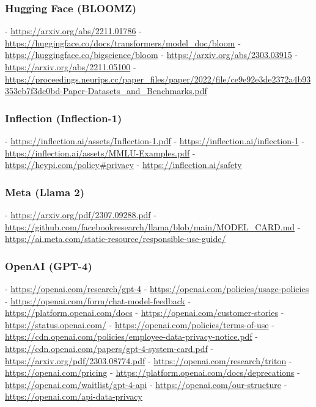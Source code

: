 \documentclass[screen, authorversion, acmsmall]{acmart}
\begin{document}
\subsubsection{Hugging Face (BLOOMZ)}
-  \url{https://arxiv.org/abs/2211.01786}
-  \url{https://huggingface.co/docs/transformers/model_doc/bloom}
-  \url{https://huggingface.co/bigscience/bloom}
-  \url{https://arxiv.org/abs/2303.03915}
-  \url{https://arxiv.org/abs/2211.05100}
-  \url{https://proceedings.neurips.cc/paper_files/paper/2022/file/ce9e92e3de2372a4b93353eb7f3dc0bd-Paper-Datasets_and_Benchmarks.pdf}

\subsubsection{Inflection (Inflection-1)}
-  \url{https://inflection.ai/assets/Inflection-1.pdf}
-  \url{https://inflection.ai/inflection-1}
-  \url{https://inflection.ai/assets/MMLU-Examples.pdf}
-  \url{https://heypi.com/policy#privacy}
-  \url{https://inflection.ai/safety}

\subsubsection{Meta (Llama 2)}
-  \url{https://arxiv.org/pdf/2307.09288.pdf}
-  \url{https://github.com/facebookresearch/llama/blob/main/MODEL_CARD.md}
-  \url{https://ai.meta.com/static-resource/responsible-use-guide/}

\clearpage

\subsubsection{OpenAI (GPT-4)}
-  \url{https://openai.com/research/gpt-4}
-  \url{https://openai.com/policies/usage-policies}
-  \url{https://openai.com/form/chat-model-feedback}
-  \url{https://platform.openai.com/docs}
-  \url{https://openai.com/customer-stories}
-  \url{https://status.openai.com/}
-  \url{https://openai.com/policies/terms-of-use}
-  \url{https://cdn.openai.com/policies/employee-data-privacy-notice.pdf}
-  \url{https://cdn.openai.com/papers/gpt-4-system-card.pdf}
-  \url{https://arxiv.org/pdf/2303.08774.pdf}
-  \url{https://openai.com/research/triton}
-  \url{https://openai.com/pricing}
-  \url{https://platform.openai.com/docs/deprecations}
-  \url{https://openai.com/waitlist/gpt-4-api}
-  \url{https://openai.com/our-structure}
-  \url{https://openai.com/api-data-privacy}
\end{document}
